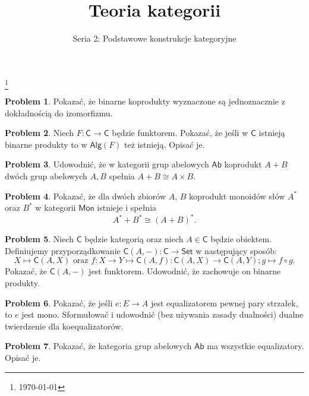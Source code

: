 \documentclass[10pt]{amsart}
\title{Teoria kategorii}
\author{Seria 2: Podstawowe konstrukcje kategoryjne}
\theoremstyle{plain}
\theoremstyle{definition}
\newtheorem{problem}{Problem}
\numberwithin{equation}{section}
\newcommand\blfootnote[1]{%
  \begingroup
  \renewcommand\thefootnote{}\footnote{#1}%
  \addtocounter{footnote}{-1}%
  \endgroup
}
\begin{document}
\maketitle

\blfootnote{\today}



\begin{problem}
Pokazać, że binarne koprodukty wyznaczone są jednoznacznie z dokładnością do izomorfizmu.
\end{problem}

\begin{problem}
Niech $F:\mathsf{C}\to \mathsf{C}$ będzie funktorem. Pokazać, że jeśli w $\mathsf{C}$ istnieją binarne produkty to  w $\mathsf{Alg}(F)$ też istnieją. Opisać je. 
\end{problem}

\begin{problem}
Udowodnić, że w kategorii grup abelowych $\mathsf{Ab}$ koprodukt $A+B$ dwóch grup abelowych $A,B$ spełnia $A+B \cong A\times B$.  
\end{problem}

\begin{problem}
Pokazać, że dla dwóch zbiorów $A$, $B$ koprodukt monoidów słów $A^\ast$ oraz $B^\ast$ w kategorii $\mathsf{Mon}$ istnieje i spełnia 
$$
A^\ast + B^\ast \cong (A+B)^\ast.
$$
\end{problem}


\begin{problem}
Niech $\mathsf{C}$ będzie kategorią oraz niech $A\in \mathsf{C}$ będzie obiektem. Definiujemy przyporządkowanie $\mathsf{C}(A,-):\mathsf{C}\to \mathsf{Set}$ w następujący sposób:
$$
X\mapsto \mathsf{C}(A,X) \text{ oraz } f:X\to Y \mapsto \mathsf{C}(A,f):\mathsf{C}(A,X)\to \mathsf{C}(A,Y);g\mapsto f\circ g. 
$$
Pokazać, że $\mathsf{C}(A,-)$ jest funktorem. Udowodnić, że zachowuje on binarne produkty. 
\end{problem}


\begin{problem}
Pokazać, że jeśli $e:E\to A$ jest equalizatorem pewnej pary strzałek, to $e$ jest mono. Sformułować i udowodnić (bez używania zasady dualności) dualne twierdzenie dla koequalizatorów. 
\end{problem}

\begin{problem}
Pokazać, że kategoria grup abelowych $\mathsf{Ab}$ ma wszystkie equalizatory. Opisać je.  
\end{problem}
\end{document}
